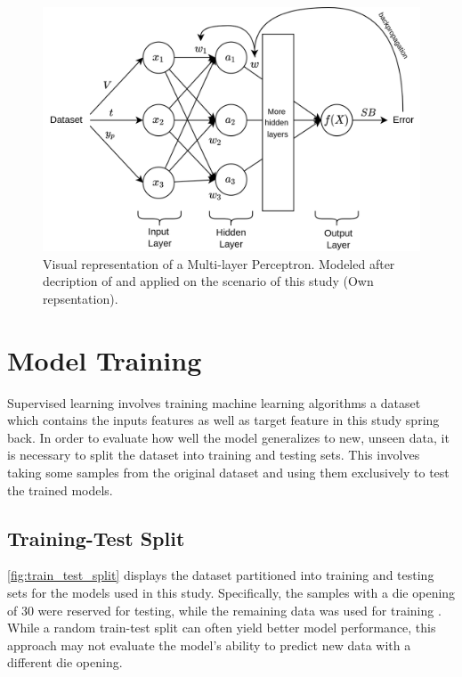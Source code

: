 \begin{figure}[h]
    \begin{tcolorbox}[arc=0pt,boxrule=0.5pt]
        \centering
        \includegraphics[width=1\textwidth]{chap4/images/mlp_example}
    \end{tcolorbox}
    \caption{Visual representation of a Multi-layer Perceptron. Modeled after decription of
    \cite{nielsen_neuralnetworksdeep_2015} and applied on the scenario of this study
        (Own repsentation). }
    \label{fig:mlp-example}
\end{figure}


\section{Model Training}\label{sec:model-training}
Supervised learning involves training machine learning algorithms a dataset which contains the inputs features as well
as target feature in this study spring back.
In order to evaluate how well the model generalizes to new, unseen data, it is necessary to
split the dataset into training and testing sets.
This involves taking some samples from the original dataset and using them exclusively to test the trained models.

\subsection{Training-Test Split}\label{subsec:training-test-split}
\cref{fig:train_test_split} displays the dataset partitioned into training and testing sets for the models used in
this study.
Specifically, the samples with a die opening of 30 were reserved for testing, while the remaining data was used for
training .
While a random train-test split can often yield better model performance, this
approach may not evaluate the model's ability to predict new data with a different die
opening.

